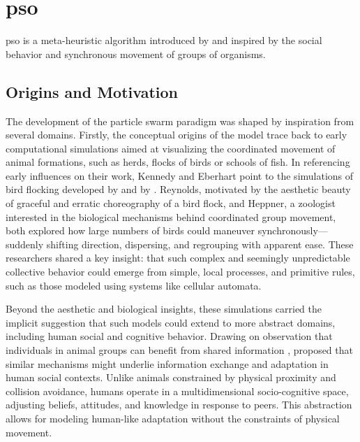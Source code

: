 \chapter[Particle Swarm Optimization (PSO)]{\acrfull{pso}}
\label{cp:introduction}

{


\nocite{eberhart1995new}
\acrfull{pso}
is 
a meta-heuristic  algorithm
introduced by \citet{kennedy1995particle} and inspired by the social behavior and synchronous movement of groups of organisms.

\section{%
Origins and Motivation}
The development of the particle swarm paradigm was shaped by inspiration from several domains.
Firstly,
the
conceptual
origins of the
model
trace back to early computational simulations aimed at visualizing the coordinated movement of animal formations, such as herds, flocks of birds or schools of fish.
In referencing early influences on their work, Kennedy and Eberhart point to the simulations of bird flocking developed by \citet{reynolds1987flocks} and by \citet{heppner1990stochastic}. Reynolds, motivated by the aesthetic beauty of 
graceful and erratic choreography of a bird flock,
and Heppner, a zoologist interested in the biological mechanisms behind coordinated group movement, both explored how large numbers of birds could maneuver synchronously---suddenly shifting direction, dispersing, and regrouping with apparent ease. These researchers shared a key insight: that such complex and seemingly unpredictable collective behavior could emerge from simple, local processes,
and primitive rules,
such as those modeled using systems like cellular automata.

Beyond the aesthetic and biological insights, these simulations carried the implicit suggestion that such models could extend to more abstract domains, including human social and cognitive behavior. Drawing on observation that individuals in animal groups can benefit from shared information \parencite{wilson1975sociobiology}, \citeauthor{kennedy1995particle} proposed that similar mechanisms might underlie information exchange and adaptation in human social contexts. Unlike animals constrained by physical proximity and collision avoidance, humans operate in a multidimensional socio-cognitive space, adjusting beliefs, attitudes, and knowledge in response to peers. This abstraction allows for modeling human-like adaptation without the constraints of physical movement.



}
